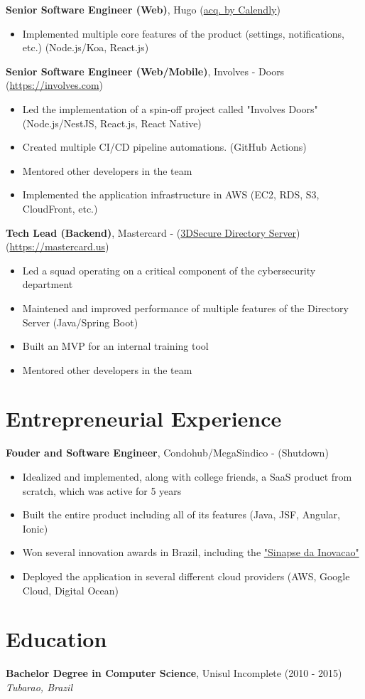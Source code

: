 \documentclass[11pt, a4paper]{article}
\begin{document}
\textbf{Senior Software Engineer (Web)}, Hugo (\href{https://www.linkedin.com/company/hugo-team/}{acq. by Calendly})
\begin{itemize}[noitemsep]
    \item Implemented multiple core features of the product (settings, notifications, etc.) (Node.js/Koa, React.js)
\end{itemize}

\textbf{Senior Software Engineer (Web/Mobile)}, Involves - Doors (\href{https://involves.com/}{https://involves.com})
\begin{itemize}[noitemsep]
    \item Led the implementation of a spin-off project called "Involves Doors" (Node.js/NestJS, React.js, React Native)
    \item Created multiple CI/CD pipeline automations. (GitHub Actions)
    \item Mentored other developers in the team
    \item Implemented the application infrastructure in AWS (EC2, RDS, S3, CloudFront, etc.)
\end{itemize}

\textbf{Tech Lead (Backend)}, Mastercard - (\href{https://developer.mastercard.com/product/3ds-smart-interface}{3DSecure Directory Server}) (\href{https://www.mastercard.us/en-us.html}{https://mastercard.us})
\begin{itemize}[noitemsep]
    \item Led a squad operating on a critical component of the cybersecurity department
    \item Maintened and improved performance of multiple features of the Directory Server (Java/Spring Boot)
    \item Built an MVP for an internal training tool
    \item Mentored other developers in the team
\end{itemize}

\section*{Entrepreneurial Experience}
\textbf{Fouder and Software Engineer}, Condohub/MegaSindico - (Shutdown)
\begin{itemize}[noitemsep]
    \item Idealized and implemented, along with college friends, a SaaS product from scratch, which was active for 5 years
    \item Built the entire product including all of its features (Java, JSF, Angular, Ionic)
    \item Won several innovation awards in Brazil, including the \href{https://certi.org.br/pt/cases-sinapse-da-inovacao}{"Sinapse da Inovacao"}
    \item Deployed the application in several different cloud providers (AWS, Google Cloud, Digital Ocean)
\end{itemize}

\section*{Education}
\textbf{Bachelor Degree in Computer Science}, Unisul \hfill Incomplete (2010 - 2015)\\
\textit{Tubarao, Brazil}
\end{document}
